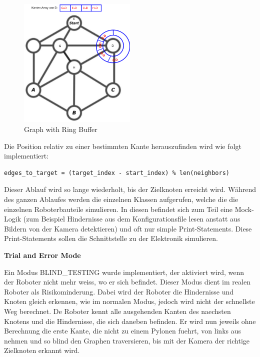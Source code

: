 \begin{figure}[H]
\centering
\includegraphics[width=0.5\textwidth]{assets/informatik-prototyp/simulator/ring-buffer-graph.png}
\caption{Graph with Ring Buffer}
\label{fig:ring-buffer-graph}
\end{figure}

Die Position relativ zu einer bestimmten Kante herauszufinden wird wie folgt implementiert:

\begin{verbatim}
edges_to_target = (target_index - start_index) % len(neighbors)
\end{verbatim}

Dieser Ablauf wird so lange wiederholt, bis der Zielknoten erreicht wird.
Während des ganzen Ablaufes werden die einzelnen Klassen aufgerufen, welche die die einzelnen Roboterbauteile simulieren. In diesen befindet sich zum Teil eine Mock-Logik (zum Beispiel Hindernisse aus dem Konfigurationsfile lesen anstatt aus Bildern von der Kamera detektieren) und oft nur simple Print-Statements. Diese Print-Statements sollen die Schnittstelle zu der Elektronik simulieren.

\textbf{Trial and Error Mode}

Ein Modus BLIND\_TESTING wurde implementiert, der aktiviert wird, wenn der Roboter nicht mehr weiss, wo er sich befindet. Dieser Modus dient im realen Roboter als Risikominderung. Dabei wird der Roboter die Hindernisse und Knoten gleich erkennen, wie im normalen Modus, jedoch wird nicht der schnellste Weg berechnet. De Roboter kennt alle ausgehenden Kanten des naechsten Knotens und die Hindernisse, die sich daneben befinden. Er wird nun jeweils ohne Berechnung die erste Kante, die nicht zu einem Pylonen fuehrt, von links aus nehmen und so blind den Graphen traversieren, bis mit der Kamera der richtige Zielknoten erkannt wird.

